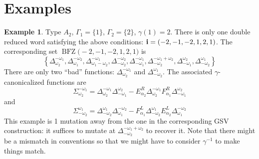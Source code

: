 \documentclass[a4paper]{amsart}
\theoremstyle{definition}
\newtheorem{example}[theorem]{Example}
\begin{document}
\section{Examples}
\begin{example}
  Type $A_2$, $\Gamma_1=\{1\}$, $\Gamma_2=\{2\}$, $\gamma(1)=2$.
  There is only one double reduced word satisfying the above conditions: ${\bf i}=(-2, -1, -2, 1, 2, 1)$.
  The corresponding set $\operatorname{BFZ}\big(-2, -1, -2, 1, 2, 1\big)$ is 
  \[
    \left\{
    \Delta_{\omega_{2}}^{-\omega_{1}},
    \Delta_{\omega_{1}}^{-\omega_{2}},
    \Delta_{\omega_{1} - \omega_{2}}^{-\omega_{1}},
    \Delta_{-\omega_{2}}^{-\omega_{2}},
    \Delta_{-\omega_{1}}^{-\omega_{1}}, 
    \Delta_{-\omega_{2}}^{-\omega_{1} + \omega_{2}},
    \Delta_{-\omega_{1}}^{\omega_{2}},
    \Delta_{-\omega_{2}}^{\omega_{1}}
    \right\}
  \]
  There are only two ``bad'' functions: $\Delta_{\omega_{2}}^{-\omega_{1}}$ and $\Delta_{-\omega_{2}}^{\omega_{1}}$.
  The associated $\gamma$-canonicalized functions are
  \[
    \Sigma_{\omega_{2}}^{-\omega_{1}}=
    \Delta_{\omega_{2}}^{-\omega_{1}}\Delta_{-\omega_1}^{\omega_2} - E_{\alpha_2}^R\Delta_{\omega_{2}}^{-\omega_{1}} F_{\alpha_1}^R\Delta_{-\omega_1}^{\omega_2}
  \]
  and
  \[
    \Sigma_{-\omega_{2}}^{\omega_{1}}=
    \Delta_{-\omega_{2}}^{\omega_{1}}\Delta_{\omega_1}^{-\omega_2} - F_{\alpha_1}^L\Delta_{-\omega_{2}}^{\omega_{1}}E_{\alpha_2}^L\Delta_{\omega_1}^{-\omega_2}
  \]
  This example is 1 mutation away from the one in the corresponding GSV construction: it suffices to mutate at $\Delta_{-\omega_{2}}^{-\omega_{1} + \omega_{2}}$ to recover it.
  Note that there might be a mismatch in conventions so that we might have to consider $\gamma^{-1}$ to make things match.
\end{example}
\end{document}
